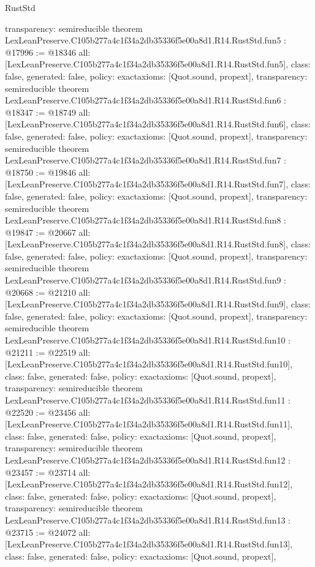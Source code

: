 \begin{lexlean}{RustStd}
\begin{coremodule}
{  transparency: semireducible
}
theorem LexLeanPreserve.C105b277a4c1f34a2db35336f5e00a8d1.R14.RustStd.fun5 : @17996 := @18346 {
  all: [LexLeanPreserve.C105b277a4c1f34a2db35336f5e00a8d1.R14.RustStd.fun5],
  class: false,
  generated: false,
  policy: exact{axioms: [Quot.sound, propext]},
  transparency: semireducible
}
theorem LexLeanPreserve.C105b277a4c1f34a2db35336f5e00a8d1.R14.RustStd.fun6 : @18347 := @18749 {
  all: [LexLeanPreserve.C105b277a4c1f34a2db35336f5e00a8d1.R14.RustStd.fun6],
  class: false,
  generated: false,
  policy: exact{axioms: [Quot.sound, propext]},
  transparency: semireducible
}
theorem LexLeanPreserve.C105b277a4c1f34a2db35336f5e00a8d1.R14.RustStd.fun7 : @18750 := @19846 {
  all: [LexLeanPreserve.C105b277a4c1f34a2db35336f5e00a8d1.R14.RustStd.fun7],
  class: false,
  generated: false,
  policy: exact{axioms: [Quot.sound, propext]},
  transparency: semireducible
}
theorem LexLeanPreserve.C105b277a4c1f34a2db35336f5e00a8d1.R14.RustStd.fun8 : @19847 := @20667 {
  all: [LexLeanPreserve.C105b277a4c1f34a2db35336f5e00a8d1.R14.RustStd.fun8],
  class: false,
  generated: false,
  policy: exact{axioms: [Quot.sound, propext]},
  transparency: semireducible
}
theorem LexLeanPreserve.C105b277a4c1f34a2db35336f5e00a8d1.R14.RustStd.fun9 : @20668 := @21210 {
  all: [LexLeanPreserve.C105b277a4c1f34a2db35336f5e00a8d1.R14.RustStd.fun9],
  class: false,
  generated: false,
  policy: exact{axioms: [Quot.sound, propext]},
  transparency: semireducible
}
theorem LexLeanPreserve.C105b277a4c1f34a2db35336f5e00a8d1.R14.RustStd.fun10 : @21211 := @22519 {
  all: [LexLeanPreserve.C105b277a4c1f34a2db35336f5e00a8d1.R14.RustStd.fun10],
  class: false,
  generated: false,
  policy: exact{axioms: [Quot.sound, propext]},
  transparency: semireducible
}
theorem LexLeanPreserve.C105b277a4c1f34a2db35336f5e00a8d1.R14.RustStd.fun11 : @22520 := @23456 {
  all: [LexLeanPreserve.C105b277a4c1f34a2db35336f5e00a8d1.R14.RustStd.fun11],
  class: false,
  generated: false,
  policy: exact{axioms: [Quot.sound, propext]},
  transparency: semireducible
}
theorem LexLeanPreserve.C105b277a4c1f34a2db35336f5e00a8d1.R14.RustStd.fun12 : @23457 := @23714 {
  all: [LexLeanPreserve.C105b277a4c1f34a2db35336f5e00a8d1.R14.RustStd.fun12],
  class: false,
  generated: false,
  policy: exact{axioms: [Quot.sound, propext]},
  transparency: semireducible
}
theorem LexLeanPreserve.C105b277a4c1f34a2db35336f5e00a8d1.R14.RustStd.fun13 : @23715 := @24072 {
  all: [LexLeanPreserve.C105b277a4c1f34a2db35336f5e00a8d1.R14.RustStd.fun13],
  class: false,
  generated: false,
  policy: exact{axioms: [Quot.sound, propext]},
}
\end{coremodule}
\end{lexlean}
